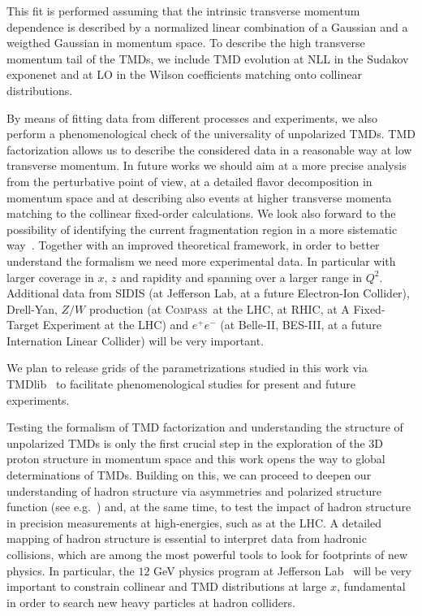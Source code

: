 \documentclass[aps,preprintnumbers,showpacs,nofootinbib,superscriptaddress,floatfix]{revtex4}
\newcommand{\compass}{\textsc{Compass}}
\begin{document}
This fit is performed assuming that the intrinsic transverse momentum
dependence is described by a normalized linear combination of a Gaussian and a
weigthed Gaussian in momentum space. 
To describe the high transverse momentum tail of the TMDs, we include TMD
evolution at NLL in the Sudakov exponenet and at LO in the Wilson coefficients
matching onto collinear distributions. 

By means of fitting data from different processes and experiments, we also perform a phenomenological check of the universality of unpolarized TMDs. 
TMD factorization allows us to describe the considered data in a reasonable way at low transverse momentum. In future works we should aim at a more precise analysis from the perturbative point of view, at a detailed flavor decomposition in momentum space and at describing also events at higher transverse momenta matching to the collinear fixed-order calculations. We look also forward to the possibility of identifying the current fragmentation region in a more sistematic way~\cite{Boglione:2016bph}.
Together with an improved theoretical framework, in order to better understand the formalism we need more experimental data. In particular with larger coverage in $x$, $z$ and rapidity and spanning over a larger range in $Q^2$. 
Additional data from SIDIS (at Jefferson Lab, at a future Electron-Ion Collider), Drell-Yan, $Z/W$ production (at \compass\, at the LHC, at RHIC, at A Fixed-Target Experiment at the LHC) and $e^+e^-$ (at Belle-II, BES-III, at a future Internation Linear Collider) will be very important. 

We plan to release grids of the parametrizations studied in this work via
TMDlib~\cite{Hautmann:2014kza} to facilitate phenomenological studies for
present and future experiments. 

Testing the formalism of TMD factorization and understanding the structure of unpolarized TMDs is only the first crucial step in the exploration of the 3D proton structure in momentum space and this work opens the way to global determinations of TMDs. 
Building on this, we can proceed to deepen our understanding of hadron structure via asymmetries and polarized structure function (see e.g.~\cite{Aschenauer:2015ndk,Boglione:2015zyc,Kikola:2017hnp}) and, at the same time, to test the impact of hadron structure in precision measurements at high-energies, such as at the LHC. A detailed mapping of hadron structure is essential to interpret data from hadronic collisions, which are among the most powerful tools to look for footprints of new physics.
In particular, the $12$ GeV physics program at Jefferson Lab~\cite{Dudek:2012vr} will be very important to constrain collinear and TMD distributions at large $x$, fundamental in order to search new heavy particles at hadron colliders.
\end{document}
